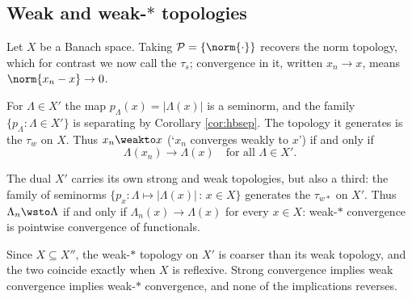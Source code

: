 \subsection{Weak and weak-\texorpdfstring{$*$}{*} topologies}

Let $X$ be a Banach space. Taking $\mathcal{P} = \{\norm{\cdot}\}$ recovers the norm topology, which for contrast we now call the  $\tau_s$; convergence in it, written $x_n \to x$, means $\norm{x_n - x}\to 0$.

\begin{definition}
	For $\Lambda \in X'$ the map $p_\Lambda(x) = |\Lambda(x)|$ is a seminorm, and the family $\{p_\Lambda : \Lambda \in X'\}$ is separating by Corollary \ref{cor:hbsep}. The topology it generates is the  $\tau_w$ on $X$. Thus $x_n \weakto x$ (`$x_n$ converges weakly to $x$') if and only if
	$$\Lambda(x_n) \to \Lambda(x) \quad \text{for all } \Lambda \in X'.$$
\end{definition}

\begin{definition}
	The dual $X'$ carries its own strong and weak topologies, but also a third: the family of seminorms $\{p_x : \Lambda \mapsto |\Lambda(x)| \, : \, x \in X\}$ generates the  $\tau_{w*}$ on $X'$. Thus $\Lambda_n \wsto \Lambda$ if and only if $\Lambda_n(x) \to \Lambda(x)$ for every $x \in X$: weak-$*$ convergence is pointwise convergence of functionals.
\end{definition}

Since $X \subseteq X''$, the weak-$*$ topology on $X'$ is coarser than its weak topology, and the two coincide exactly when $X$ is reflexive. Strong convergence implies weak convergence implies weak-$*$ convergence, and none of the implications reverses.

